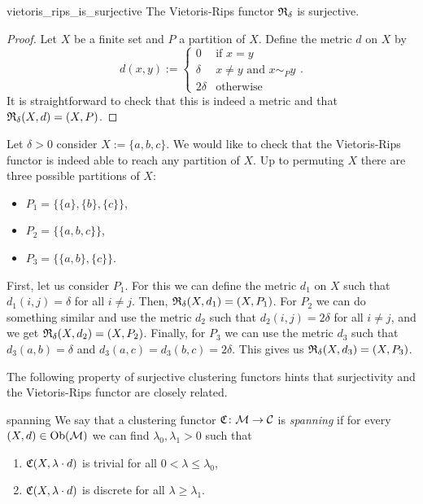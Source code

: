\begin{proposition}{\cite[Rem.~6.1]{Carlsson2010}}{vietoris_rips_is_surjective}
    The Vietoris-Rips functor $\mathfrak{R}_\delta$ is surjective.
\end{proposition}
\begin{proof}
Let $X$ be a finite set and $P$ a partition of $X$. Define the metric $d$ on $X$ by
\begin{equation*}
    d(x,y) := \begin{cases}
        0 & \text{if } x = y\\
        \delta & x \neq y \text{ and } x \sim_P y\\
        2\delta & \text{otherwise}
    \end{cases}.
\end{equation*}
It is straightforward to check that this is indeed a metric and that $\mathfrak{R}_\delta(X,d) = (X,P)$.
\end{proof}

\begin{example}{}{}
Let $\delta > 0$ consider $X := \{a,b,c\}$. We would like to check that the Vietoris-Rips functor is indeed able to reach any partition of $X$. Up to permuting $X$ there are three possible partitions of $X$:
\begin{itemize}
    \item $P_1 = \{\{a\}, \{b\}, \{c\}\}$,
    \item $P_2 = \{\{a,b,c\}\}$,
    \item $P_3 = \{\{a,b\}, \{c\}\}$.
\end{itemize}
First, let us consider $P_1$. For this we can define the metric $d_1$ on $X$ such that $d_1(i,j) = \delta$ for all $i \neq j$. Then, $\mathfrak{R}_\delta(X,d_1) = (X,P_1)$.
For $P_2$ we can do something similar and use the metric $d_2$ such that $d_2(i,j) = 2\delta$ for all $i \neq j$, and we get $\mathfrak{R}_\delta(X,d_2) = (X,P_2)$.
Finally, for $P_3$ we can use the metric $d_3$ such that $d_3(a,b) = \delta$ and $d_3(a,c) = d_3(b,c) = 2\delta$. This gives us $\mathfrak{R}_\delta(X,d_3) = (X,P_3)$.
\end{example}

The following property of surjective clustering functors hints that surjectivity and the Vietoris-Rips functor are closely related.

\begin{definition}{}{spanning}
    We say that a clustering functor $\mathfrak{C}\colon \mathcal{M} \to \mathcal{C}$ is \emph{spanning} if for every ${(X,d) \in \mathrm {Ob}(\mathcal{M})}$ we can find $\lambda_0, \lambda_1 > 0$ such that
    \begin{enumerate}
        \item $\mathfrak{C}(X,\lambda \cdot d)$ is trivial for all $0 < \lambda \le \lambda_0$,
        \item $\mathfrak{C}(X,\lambda \cdot d)$ is discrete for all $\lambda \ge \lambda_1$.
    \end{enumerate}
\end{definition}


